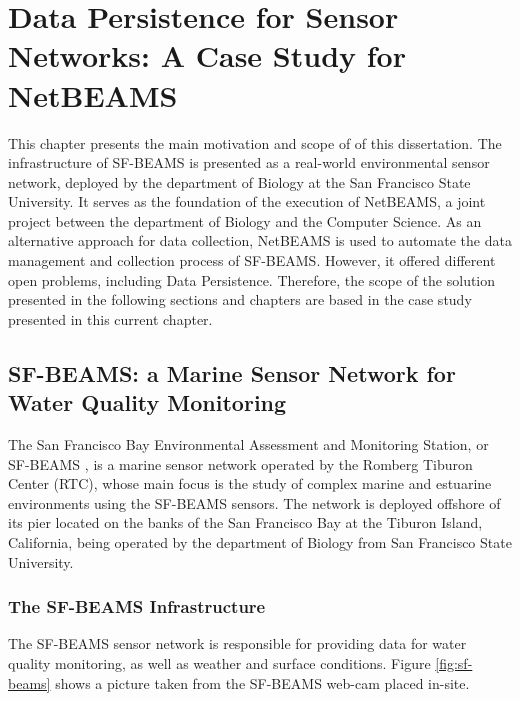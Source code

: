 

\chapter{Data Persistence for Sensor Networks: A Case Study for NetBEAMS}
\label{chap:netbeams-overview}

This chapter presents the main motivation and scope of of this dissertation.
The infrastructure of SF-BEAMS is presented as a real-world environmental
sensor network, deployed by the department of Biology at the San Francisco State
University. It serves as the foundation of the execution of NetBEAMS, a
joint project between the department of Biology and the Computer Science.
As an alternative approach for data collection, NetBEAMS is used to
automate the data management and collection process of SF-BEAMS. However, it
offered different open problems, including Data Persistence. Therefore, the
scope of the solution presented in the following sections and chapters are
based in the case study presented in this current chapter.

\section{SF-BEAMS: a Marine Sensor Network for Water Quality Monitoring}

The San Francisco Bay Environmental Assessment and Monitoring Station, or
SF-BEAMS \cite{sfbeams2006}, is a marine sensor network operated by the Romberg
Tiburon Center (RTC), whose main focus is the study of complex marine and
estuarine environments using the SF-BEAMS sensors. The network is deployed
offshore of its pier located on the banks of the San Francisco Bay at the
Tiburon Island, California, being operated by the department of Biology from
San Francisco State University.

\subsection{The SF-BEAMS Infrastructure}

The SF-BEAMS sensor network is responsible for providing data for water quality
monitoring, as well as weather and surface conditions. Figure
\ref{fig:sf-beams} shows a picture taken from the SF-BEAMS web-cam placed
in-site.

